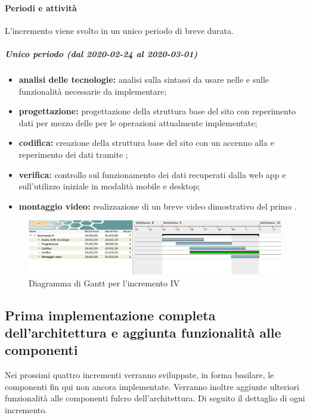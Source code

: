 			\paragraph{Periodi e attività}
			
				L'incremento viene svolto in un unico periodo di breve durata.
				
				\subparagraph{Unico periodo (dal 2020-02-24 al 2020-03-01)}
				
					\begin{itemize}
						\item \textbf{analisi delle tecnologie:} analisi sulla sintassi da usare nelle  e sulle funzionalità necessarie da implementare;	
						\item \textbf{progettazione:} progettazione della struttura base del sito con reperimento dati per mezzo delle  per le operazioni attualmente implementate;
						\item \textbf{codifica:} creazione della struttura base del sito con un accenno alla  e reperimento dei dati tramite ;
						\item \textbf{verifica:} controllo sul funzionamento dei dati recuperati dalla web app e sull'utilizzo iniziale in modalità mobile e desktop;
						\item \textbf{montaggio video:} realizzazione di un breve video dimostrativo del primo .
					\end{itemize} 			

		\begin{landscape}
          \begin{figure}[H]
            \centering
            \includegraphics[width=\linewidth]{images/gantt/incrementoIV} %
            \caption{Diagramma di Gantt per l'incremento IV}
          \end{figure}		
		\end{landscape}

		
		\subsection{Prima implementazione completa dell'architettura e aggiunta funzionalità alle componenti}
		Nei prossimi quattro incrementi verranno sviluppate, in forma basilare, le componenti fin qui non ancora implementate. Verranno inoltre aggiunte ulteriori funzionalità alle componenti fulcro dell'architettura. \newline
		Di seguito il dettaglio di ogni incremento.
		
